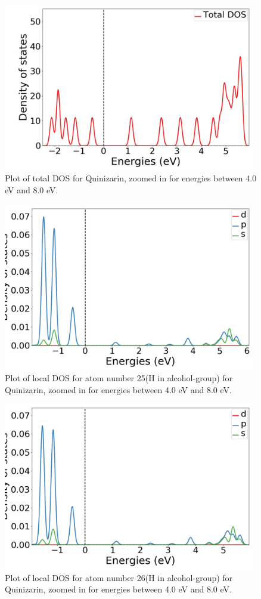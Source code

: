 \documentclass{article}
\begin{document}
      \begin{figure}[H]
        \centering
        \includegraphics[width = 11cm]{../fig/basic_TDOS_2.png}
        \caption{Plot of total DOS for Quinizarin, zoomed in for energies between 4.0 eV and 8.0 eV. }
        \label{fig:basic_TDOS_2}
      \end{figure}

      \begin{figure}[H]
        \centering
        \includegraphics[width = 11cm]{../fig/basic_LDOS25_2.png}
        \caption{Plot of local DOS for atom number 25(H in alcohol-group) for Quinizarin, zoomed in for energies between 4.0 eV and 8.0 eV. }
        \label{fig:basic_LDOS25_2}
      \end{figure}

      \begin{figure}[H]
        \centering
        \includegraphics[width = 11cm]{../fig/basic_LDOS26_2.png}
        \caption{Plot of local DOS for atom number 26(H in alcohol-group) for Quinizarin, zoomed in for energies between 4.0 eV and 8.0 eV. }
        \label{fig:basic_LDOS26_2}
      \end{figure}
\end{document}
